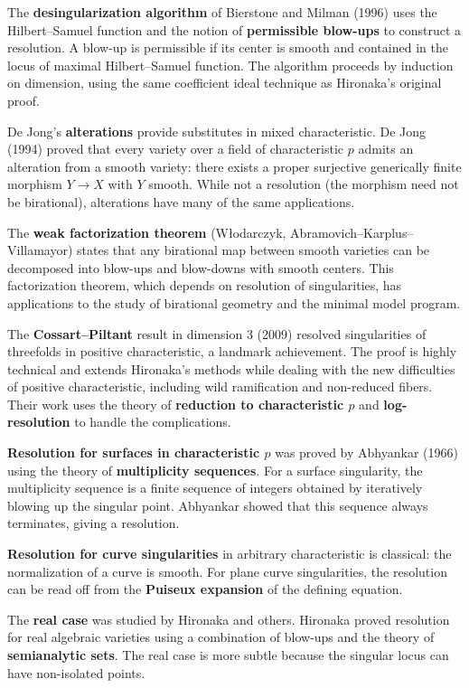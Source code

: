 The \textbf{desingularization algorithm} of Bierstone and Milman (1996) uses the Hilbert--Samuel function and the notion of \textbf{permissible blow-ups} to construct a resolution. A blow-up is permissible if its center is smooth and contained in the locus of maximal Hilbert--Samuel function. The algorithm proceeds by induction on dimension, using the same coefficient ideal technique as Hironaka's original proof.

De Jong's \textbf{alterations} provide substitutes in mixed characteristic. De Jong (1994) proved that every variety over a field of characteristic $p$ admits an alteration from a smooth variety: there exists a proper surjective generically finite morphism $Y \to X$ with $Y$ smooth. While not a resolution (the morphism need not be birational), alterations have many of the same applications.

The \textbf{weak factorization theorem} (W\l{}odarczyk, Abramovich--Karplus--Villamayor) states that any birational map between smooth varieties can be decomposed into blow-ups and blow-downs with smooth centers. This factorization theorem, which depends on resolution of singularities, has applications to the study of birational geometry and the minimal model program.

The \textbf{Cossart--Piltant} result in dimension 3 (2009) resolved singularities of threefolds in positive characteristic, a landmark achievement. The proof is highly technical and extends Hironaka's methods while dealing with the new difficulties of positive characteristic, including wild ramification and non-reduced fibers. Their work uses the theory of \textbf{reduction to characteristic $p$} and \textbf{log-resolution} to handle the complications.

\textbf{Resolution for surfaces in characteristic $p$} was proved by Abhyankar (1966) using the theory of \textbf{multiplicity sequences}. For a surface singularity, the multiplicity sequence is a finite sequence of integers obtained by iteratively blowing up the singular point. Abhyankar showed that this sequence always terminates, giving a resolution.

\textbf{Resolution for curve singularities} in arbitrary characteristic is classical: the normalization of a curve is smooth. For plane curve singularities, the resolution can be read off from the \textbf{Puiseux expansion} of the defining equation.

The \textbf{real case} was studied by Hironaka and others. Hironaka proved resolution for real algebraic varieties using a combination of blow-ups and the theory of \textbf{semianalytic sets}. The real case is more subtle because the singular locus can have non-isolated points.

